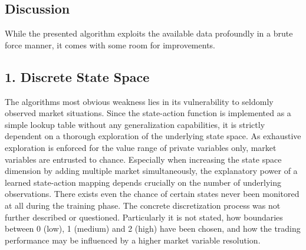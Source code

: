 \subsection{Discussion}
\label{chap:backwardalgorithm:discussion}
While the presented algorithm exploits the available data profoundly in a brute force manner, it comes with some room for improvements.\\

\subsection*{1. Discrete State Space}
The algorithms most obvious weakness lies in its vulnerability to seldomly observed market situations. Since the state-action function is implemented as a simple lookup table without any generalization capabilities, it is strictly dependent on a thorough exploration of the underlying state space. As exhaustive exploration is enforced for the value range of private variables only, market variables are entrusted to chance. Especially when increasing the state space dimension by adding multiple market simultaneously, the explanatory power of a learned state-action mapping depends crucially on the number of underlying observations. There exists even the chance of certain states never been monitored at all during the training phase. The concrete discretization process was not further described or questioned. Particularly it is not stated, how boundaries between 0 (low), 1 (medium) and 2 (high) have been chosen, and how the trading performance may be influenced by a higher market variable resolution.

